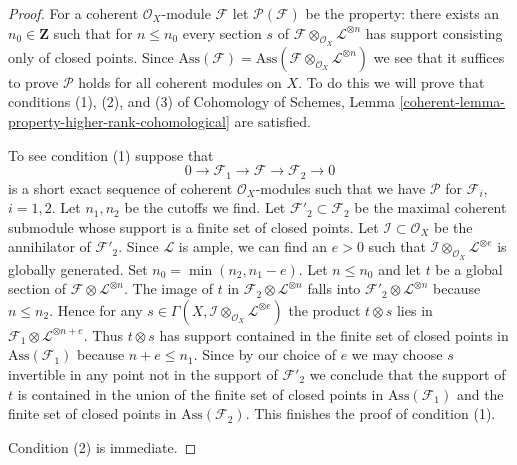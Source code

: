 \begin{proof}

For a coherent $\mathcal{O}_X$-module $\mathcal{F}$
let $\mathcal{P}(\mathcal{F})$ be the property: there
exists an $n_0 \in \mathbf{Z}$ such that for $n \leq n_0$
every section $s$ of
$\mathcal{F} \otimes_{\mathcal{O}_X} \mathcal{L}^{\otimes n}$
has support consisting only of closed points.
Since $\text{Ass}(\mathcal{F}) =
\text{Ass}(\mathcal{F} \otimes_{\mathcal{O}_X} \mathcal{L}^{\otimes n})$
we see that it suffices to prove $\mathcal{P}$
holds for all coherent modules on $X$.
To do this we will prove that conditions (1), (2), and (3) of
Cohomology of Schemes, Lemma
\ref{coherent-lemma-property-higher-rank-cohomological}
are satisfied.

\medskip\noindent
To see condition (1) suppose that
$$
0 \to \mathcal{F}_1 \to \mathcal{F} \to \mathcal{F}_2 \to 0
$$
is a short exact sequence of coherent $\mathcal{O}_X$-modules
such that we have $\mathcal{P}$ for $\mathcal{F}_i$, $i = 1, 2$.
Let $n_1, n_2$ be the cutoffs we find.
Let $\mathcal{F}'_2 \subset \mathcal{F}_2$ be the maximal
coherent submodule whose support is a finite set of closed
points. Let $\mathcal{I} \subset \mathcal{O}_X$ be the annihilator
of $\mathcal{F}'_2$. Since $\mathcal{L}$ is ample, we can find an $e > 0$
such that $\mathcal{I} \otimes_{\mathcal{O}_X} \mathcal{L}^{\otimes e}$
is globally generated. Set $n_0 = \min(n_2, n_1 - e)$. Let $n \leq n_0$
and let $t$ be a global section of
$\mathcal{F} \otimes \mathcal{L}^{\otimes n}$.
The image of $t$ in $\mathcal{F}_2 \otimes \mathcal{L}^{\otimes n}$
falls into $\mathcal{F}'_2 \otimes \mathcal{L}^{\otimes n}$ because
$n \leq n_2$. Hence for any
$s \in \Gamma(X, \mathcal{I} \otimes_{\mathcal{O}_X} \mathcal{L}^{\otimes e})$
the product $t \otimes s$ lies in
$\mathcal{F}_1 \otimes \mathcal{L}^{\otimes n + e}$.
Thus $t \otimes s$ has support contained in
the finite set of closed points in $\text{Ass}(\mathcal{F}_1)$
because $n + e \leq n_1$. Since by our choice of $e$
we may choose $s$ invertible in any point
not in the support of $\mathcal{F}'_2$
we conclude that the support of $t$ is contained in the union of the
finite set of closed points in $\text{Ass}(\mathcal{F}_1)$ and
the finite set of closed points in $\text{Ass}(\mathcal{F}_2)$.
This finishes the proof of condition (1).

\medskip\noindent
Condition (2) is immediate.


\end{proof}
